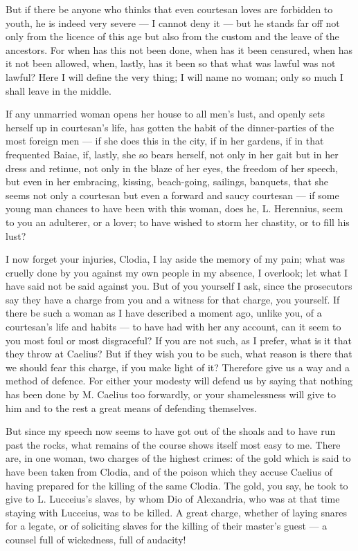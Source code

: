  But if there be anyone who thinks that even courtesan loves are forbidden to youth, he is indeed very severe --- I cannot deny it --- but he stands far off not only from the licence of this age but also from the custom and the leave of the ancestors. For when has this not been done, when has it been censured, when has it not been allowed, when, lastly, has it been so that what was lawful was not lawful? Here I will define the very thing; I will name no woman; only so much I shall leave in the middle.

 If any unmarried woman opens her house to all men's lust, and openly sets herself up in courtesan's life, has gotten the habit of the dinner-parties of the most foreign men --- if she does this in the city, if in her gardens, if in that frequented Baiae, if, lastly, she so bears herself, not only in her gait but in her dress and retinue, not only in the blaze of her eyes, the freedom of her speech, but even in her embracing, kissing, beach-going, sailings, banquets, that she seems not only a courtesan but even a forward and saucy courtesan --- if some young man chances to have been with this woman, does he, L. Herennius, seem to you an adulterer, or a lover; to have wished to storm her chastity, or to fill his lust?

 I now forget your injuries, Clodia, I lay aside the memory of my pain; what was cruelly done by you against my own people in my absence, I overlook; let what I have said not be said against you. But of you yourself I ask, since the prosecutors say they have a charge from you and a witness for that charge, you yourself. If there be such a woman as I have described a moment ago, unlike you, of a courtesan's life and habits --- to have had with her any account, can it seem to you most foul or most disgraceful? If you are not such, as I prefer, what is it that they throw at Caelius? But if they wish you to be such, what reason is there that we should fear this charge, if you make light of it? Therefore give us a way and a method of defence. For either your modesty will defend us by saying that nothing has been done by M. Caelius too forwardly, or your shamelessness will give to him and to the rest a great means of defending themselves.

 But since my speech now seems to have got out of the shoals and to have run past the rocks, what remains of the course shows itself most easy to me. There are, in one woman, two charges of the highest crimes: of the gold which is said to have been taken from Clodia, and of the poison which they accuse Caelius of having prepared for the killing of the same Clodia. The gold, you say, he took to give to L. Lucceius's slaves, by whom Dio of Alexandria, who was at that time staying with Lucceius, was to be killed. A great charge, whether of laying snares for a legate, or of soliciting slaves for the killing of their master's guest --- a counsel full of wickedness, full of audacity!

